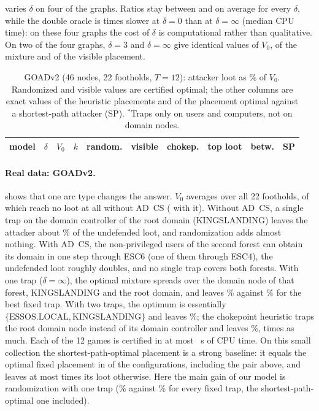 \documentclass[runningheads]{llncs}
\begin{document}
 varies $\delta$ on four of the graphs. Ratios stay between \DeltaRatioMin{} and \DeltaRatioMax{} on average for every $\delta$, while the double oracle is \TdoRatio{} times slower at $\delta=0$ than at $\delta=\infty$ (median CPU time): on these four graphs the cost of $\delta$ is computational rather than qualitative. On two of the four graphs, $\delta=3$ and $\delta=\infty$ give identical values of $V_0$, of the mixture and of the visible placement.

\begin{table}[t]
\centering
\caption{GOADv2 (46 nodes, 22 footholds, $T=12$): attacker loot as \% of $V_0$. Randomized and visible values are certified optimal; the other columns are exact values of the heuristic placements and of the placement optimal against a shortest-path attacker (SP). $^\ast$Traps only on users and computers, not on domain nodes.}\label{tab:goad}
\small\setlength{\tabcolsep}{3pt}
\begin{tabular}{llrrrrrrrr}
\toprule
model & $\delta$ & $V_0$ & $k$ & random. & visible & chokep. & top loot & betw. & SP\\
\midrule
\end{tabular}
\end{table}

\paragraph{Real data: GOADv2.}
 shows that one arc type changes the answer. $V_0$ averages over all 22 footholds, \GoadZeroNo{} of which reach no loot at all without AD~CS (\GoadZeroAdcs{} with it). Without AD~CS, a single trap on the domain controller of the root domain (KINGSLANDING) leaves the attacker about \GoadVisNoOne\% of the undefended loot, and randomization adds almost nothing. With AD~CS, the non-privileged users of the second forest can obtain its domain in one step through ESC6 (one of them through ESC4), the undefended loot roughly doubles, and no single trap covers both forests. With one trap ($\delta=\infty$), the optimal mixture spreads over the domain node of that forest, KINGSLANDING and the root domain, and leaves \GoadMixAdcsOne\% against \GoadVisAdcsOne\% for the best fixed trap. With two traps, the optimum is essentially $\{\text{ESSOS.LOCAL},\text{KINGSLANDING}\}$ and leaves \GoadMixAdcsTwo\%; the chokepoint heuristic traps the root domain node instead of its domain controller and leaves \GoadChokeAdcsTwo\%, \GoadChokeOverMixTwo{} times as much. Each of the 12 games is certified in at most \GoadCpuMax~s of CPU time. On this small collection the shortest-path-optimal placement is a strong baseline: it equals the optimal fixed placement in \GoadSpEqVis{} of the \GoadSpTot{} configurations, including the pair above, and leaves at most \GoadSpMaxOverVis{} times its loot otherwise. Here the main gain of our model is randomization with one trap (\GoadMixAdcsOne\% against \GoadVisAdcsOne\% for every fixed trap, the shortest-path-optimal one included).
\end{document}
